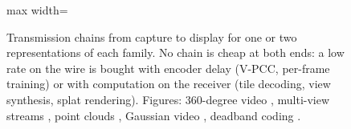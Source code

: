 \begin{figure}[t]
\begin{adjustbox}{max width=\linewidth}
\end{adjustbox}
\caption{Transmission chains from capture to display for one or two representations of each family. No
chain is cheap at both ends: a low rate on the wire is bought with encoder delay (V-PCC, per-frame
training) or with computation on the receiver (tile decoding, view synthesis, splat rendering). Figures:
360-degree video \cite{W2623027537,W2896840651}, multi-view streams \cite{W4200107448}, point clouds
\cite{W4362496249,W3021314748}, Gaussian video \cite{W4404525293}, deadband coding \cite{W2912555763}.}
\label{fig:encode-chains}
\end{figure}

